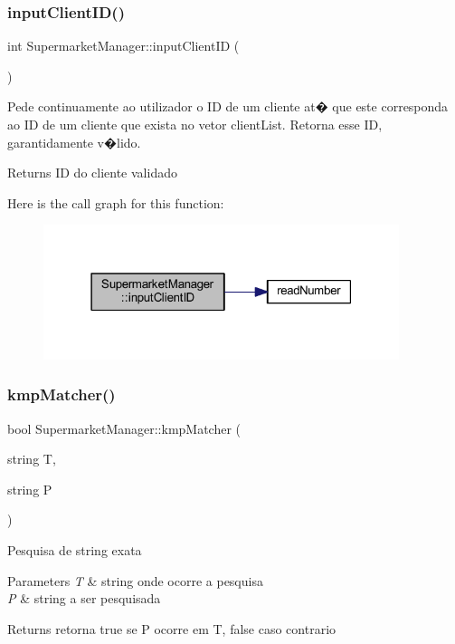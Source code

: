 \subsubsection{\texorpdfstring{input\+Client\+I\+D()}{inputClientID()}}
{\footnotesize\ttfamily int Supermarket\+Manager\+::input\+Client\+ID (\begin{DoxyParamCaption}{ }\end{DoxyParamCaption})}

Pede continuamente ao utilizador o ID de um cliente at� que este corresponda ao ID de um cliente que exista no vetor client\+List. Retorna esse ID, garantidamente v�lido.

\begin{DoxyReturn}{Returns}
ID do cliente validado 
\end{DoxyReturn}
Here is the call graph for this function\+:
\nopagebreak
\begin{figure}[H]
\begin{center}
\leavevmode
\includegraphics[width=295pt]{class_supermarket_manager_a45ed55914bea37bcf0d5757d1ce027c4_cgraph}
\end{center}
\end{figure}
\mbox{\label{class_supermarket_manager_a6a688cb8cec4cc323cf4e53e04068c2c}} 
\subsubsection{\texorpdfstring{kmp\+Matcher()}{kmpMatcher()}}
{\footnotesize\ttfamily bool Supermarket\+Manager\+::kmp\+Matcher (\begin{DoxyParamCaption}\item[{string}]{T,  }\item[{string}]{P }\end{DoxyParamCaption})}

Pesquisa de string exata 
\begin{DoxyParams}{Parameters}
{\em T} & string onde ocorre a pesquisa \\
\hline
{\em P} & string a ser pesquisada \\
\hline
\end{DoxyParams}
\begin{DoxyReturn}{Returns}
retorna true se P ocorre em T, false caso contrario 
\end{DoxyReturn}
\mbox{\label{class_supermarket_manager_a0072988df7db4459fe0a409894af51a4}} 
